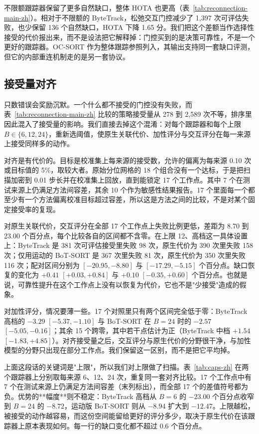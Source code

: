 不限额跟踪器保留了更多自然缺口，整体 HOTA 也更高（表~\ref{tab:reconnection-main-zh}）。相对于不限额的 ByteTrack，松弛交互门控减少了 1,397 次可评估失败，也少保留 136 个自然缺口，HOTA 下降 1.65 分。我们把这个差额当作选择性接受的代价报出来，而不是设法把它解释掉：门控买到的是决策可靠性，不是一个更好的跟踪器。OC-SORT \cite{cao2023ocsort} 作为整体跟踪参照列入，其输出支持同一套缺口评测，但它的内部重连机制走的是另一套协议。

\subsection{接受量对齐}
\label{sec:matched-zh}

只数错误会奖励沉默。一个什么都不接受的门控没有失败，而表~\ref{tab:reconnection-main-zh} 比较的策略接受量从 278 到 2,589 次不等，排序里因此混入了接受量的影响。我们直接去掉这个混淆：对每个跟踪器和每个上限 $B\in\{6,12,24\}$，重新选阈值，使原生关联代价、加性评分与交互评分在每一来源上接受同样多的动作。

对齐是有代价的。目标是校准集上每来源的接受数，允许的偏离为每来源 0.10 次或目标值的 5\%，取较大者。原始分位网格的 18 个组合没有一个达标，于是把扫描加密到 0.01 步长并在校准集上回放，直到能锁定 17 个工作点。其中 7 个在测试来源上仍满足方法间容差，其余 10 个作为敏感性结果报告。17 个里面每一个都至少有一个方法偏离校准目标超过容差，所以这是方法之间的比较，不是对某个固定接受率的复现。

对原生关联代价，交互评分在全部 17 个工作点上失败比例更低，差距为 8.70 到 23.00 个百分点，每个比较各自的区间都不含零。在上限 12、高档这一具体设置上：ByteTrack 是 381 次可评估接受里失败 98 次，原生代价为 390 次里失败 158 次；仅用运动的 BoT-SORT 是 367 次里失败 81 次，原生代价为 350 次里失败 116 次；配对区间分别为 $[-20.95,-8.80]$ 与 $[-17.29,-5.15]$ 个百分点。缺口恢复的变化为 $+0.41$ $[+0.03,+0.84]$ 与 $+0.10$ $[-0.35,+0.60]$ 个百分点。也就是说，可靠性提升在这个工作点上没有以恢复为代价，它也不是"少接受"造成的假象。

对加性评分，情况要薄一些。17 个对照里只有两个区间完全低于零：ByteTrack 高档的 $-3.29$ $[-5.37,-1.10]$ 与 BoT-SORT 在 $B=24$ 时的 $-2.57$ $[-5.05,-0.16]$；其余 15 个跨零，其中若干点估计为正（ByteTrack 中档 $+1.54$ $[-1.83,+4.85]$）。对齐接受量之后，交互评分与原生代价的分野很干净，与加性模型的分野只出现在部分工作点。我们保留这一区别，而不是把它平均掉。

上面这段话的关键词是"上限"，所以我们对上限做了扫描。表~\ref{tab:caps-zh} 在两个跟踪器上分别取每来源 6、12、24 次，重复同一套对齐比较。17 个工作点中有 7 个在测试来源上仍满足方法间容差（末列标出），而全部 17 个的差值符号都为负。优势的**幅度**则不稳定：ByteTrack 高档从 $B=6$ 的 $-23.00$ 个百分点收窄到 $B=24$ 的 $-8.72$，运动版 BoT-SORT 则从 $-8.94$ 扩大到 $-12.47$。上限越松，被接受的动作越容易，而这份空间能留给更好的评分多少，取决于原生代价在该跟踪器上原本表现如何。每一行的缺口变化都不超过 0.6 个百分点。

